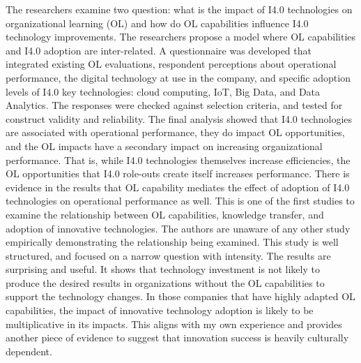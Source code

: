\begin{adjustwidth}{1in}{}
  \begin{hangpara}{.25in}{1}
  \end{hangpara}
\end{adjustwidth}
The researchers examine two question: what is the impact of I4.0 technologies on organizational learning (OL) and how do OL capabilities influence I4.0 technology improvements. The researchers propose a model where  OL capabilities and I4.0 adoption are inter-related. A questionnaire was developed that integrated existing OL evaluations, respondent perceptions about operational performance, the digital technology at use in the company, and specific adoption levels of I4.0 key technologies: cloud computing, IoT, Big Data, and Data Analytics. The responses were checked against selection criteria, and tested for construct validity and reliability. The final analysis showed that I4.0 technologies are associated with operational performance, they do impact OL opportunities, and the OL impacts have a secondary impact on increasing organizational performance. That is, while I4.0 technologies themselves increase efficiencies, the OL opportunities that I4.0 role-outs create itself increases performance. There is evidence in the results that OL capability mediates the effect of adoption of I4.0 technologies on operational performance as well. This is one of the first studies to examine the relationship between OL capabilities, knowledge transfer, and adoption of innovative technologies. The authors are unaware of any other study empirically demonstrating the relationship being examined. This study is well structured, and focused on a narrow question with intensity. The results are surprising and useful. It shows that technology investment is not likely to produce the desired results in organizations without the OL capabilities to support the technology changes. In those companies that have highly adapted OL capabilities, the impact of innovative technology adoption is likely to be multiplicative in its impacts. This aligns with my own experience and provides another piece of evidence to suggest that innovation success is heavily culturally dependent.
